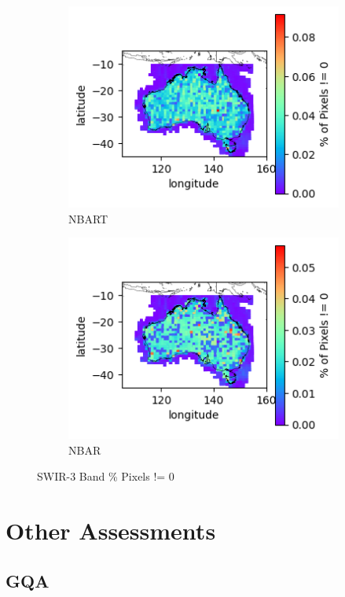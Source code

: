\documentclass[a4paper]{article}
\begin{document}
      \begin{figure}[h!]
        \centering
          \begin{subfigure}[l]{.4\linewidth}
            \hspace{-32mm}
            \includegraphics[scale=0.9]{plots/nbart/nbart_swir_3-PercentDifferent.png}
            \caption{NBART}
          \end{subfigure}
%
          \begin{subfigure}[r]{.4\linewidth}
            \includegraphics[scale=0.9]{plots/nbar/nbar_swir_3-PercentDifferent.png}
            \caption{NBAR}
          \end{subfigure}
        \caption{SWIR-3 Band \% Pixels != 0}\label{figure:33}
      \end{figure}

  \clearpage

  \section{Other Assessments}

    \subsection{GQA}
\end{document}
